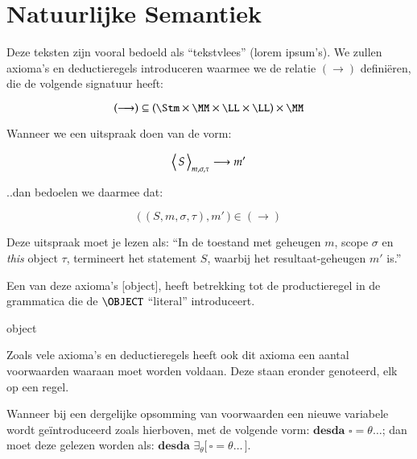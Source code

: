 
\chapter{Natuurlijke Semantiek}

Deze teksten zijn vooral bedoeld als ``tekstvlees'' (lorem ipsum's). We zullen axioma's en deductieregels introduceren waarmee we de relatie $(\longrightarrow)$ definiëren, die de volgende signatuur heeft:

$$ (\longrightarrow) \subseteq (\Stm \times \MM \times \LL \times \LL) \times \MM $$

Wanneer we een uitspraak doen van de vorm:

$$ \Config{S}{m,\sigma,\tau} \longrightarrow m' $$

..dan bedoelen we daarmee dat:

$$ \big(\,(S,m,\sigma,\tau), m'\,\big) \in (\longrightarrow) $$

Deze uitspraak moet je lezen als: ``In de toestand met geheugen $m$, scope $\sigma$ en \emph{this} object $\tau$, termineert het statement $S$, waarbij het resultaat-geheugen $m'$ is.''

Een van deze axioma's [object], heeft betrekking tot de productieregel in de grammatica die de $\OBJECT$ ``literal'' introduceert.

\begin{NSAxiom}{object}
  \begin{prooftree}
  \end{prooftree}
  \begin{NSConditions}
  \end{NSConditions}
\end{NSAxiom}

Zoals vele axioma's en deductieregels heeft ook dit axioma een aantal voorwaarden waaraan moet worden voldaan. Deze staan eronder genoteerd, elk op een regel.

Wanneer bij een dergelijke opsomming van voorwaarden een nieuwe variabele wordt geïntroduceerd zoals hierboven, met de volgende vorm: $\textbf{desda } \square = \theta \dots$; dan moet deze gelezen worden als: $\textbf{desda } \exists_\theta \big[\, \square = \theta \dots \,\big]$.

